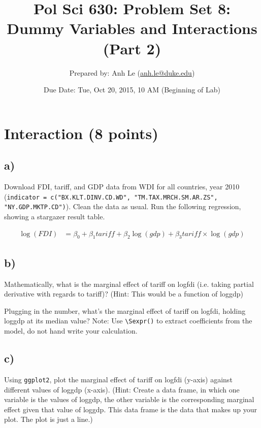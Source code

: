 \documentclass{article}\usepackage[]{graphicx}\usepackage[]{color}
\begin{document}
\title{Pol Sci 630:  Problem Set 8: Dummy Variables and Interactions (Part 2)}

\author{Prepared by: Anh Le (\href{mailto:anh.le@duke.edu}{anh.le@duke.edu})}

\date{Due Date: Tue, Oct 20, 2015, 10 AM (Beginning of Lab)}

\maketitle

\section{Interaction (8 points)}

\subsection*{a)}

Download FDI, tariff, and GDP data from WDI for all countries, year 2010 (\verb`indicator = c("BX.KLT.DINV.CD.WD", "TM.TAX.MRCH.SM.AR.ZS", "NY.GDP.MKTP.CD")`). Clean the data as usual. Run the following regression, showing a stargazer result table.

\begin{align}
\log(FDI) &= \beta_0 + \beta_1 tariff + \beta_2 \log(gdp) + \beta_3 tariff \times \log(gdp)
\end{align}

\subsection*{b)}

Mathematically, what is the marginal effect of tariff on logfdi (i.e. taking partial derivative with regards to tariff)? (Hint: This would be a function of loggdp)

Plugging in the number, what's the marginal effect of tariff on logfdi, holding loggdp at its median value? Note: Use \verb`\Sexpr()` to extract coefficients from the model, do not hand write your calculation.

\subsection*{c)}

Using \verb`ggplot2`, plot the marginal effect of tariff on logfdi (y-axis) against different values of loggdp (x-axis). (Hint: Create a data frame, in which one variable is the values of loggdp, the other variable is the corresponding marginal effect given that value of loggdp. This data frame is the data that makes up your plot. The plot is just a line.)
\end{document}
